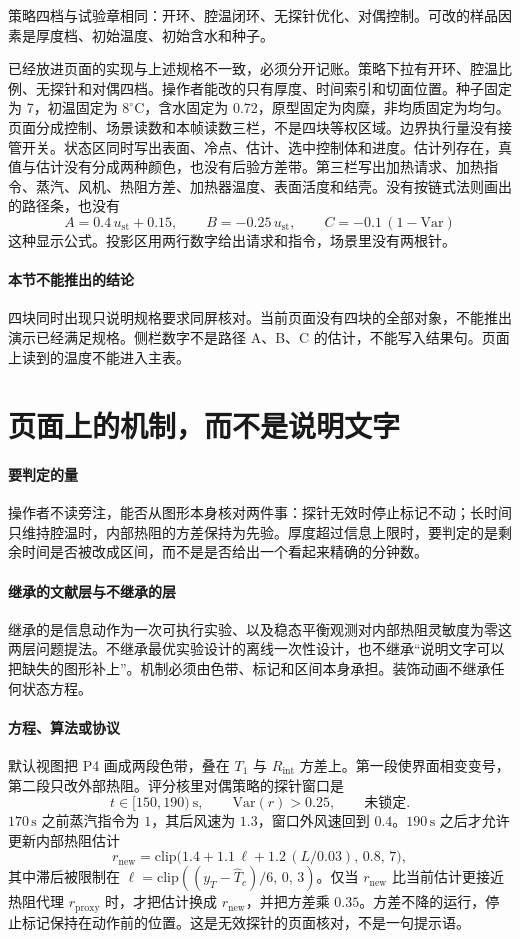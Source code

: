 策略四档与试验章相同：开环、腔温闭环、无探针优化、对偶控制。可改的样品因素是厚度档、初始温度、初始含水和种子。

已经放进页面的实现与上述规格不一致，必须分开记账。策略下拉有开环、腔温比例、无探针和对偶四档。操作者能改的只有厚度、时间索引和切面位置。种子固定为 7，初温固定为 $8^\circ\mathrm{C}$，含水固定为 0.72，原型固定为肉糜，非均质固定为均匀。页面分成控制、场景读数和本帧读数三栏，不是四块等权区域。边界执行量没有接管开关。状态区同时写出表面、冷点、估计、选中控制体和进度。估计列存在，真值与估计没有分成两种颜色，也没有后验方差带。第三栏写出加热请求、加热指令、蒸汽、风机、热阻方差、加热器温度、表面活度和结壳。没有按链式法则画出的路径条，也没有
\[
A=0.4\,u_{\mathrm{st}}+0.15,\qquad
B=-0.25\,u_{\mathrm{st}},\qquad
C=-0.1\,(1-\mathrm{Var})
\]
这种显示公式。投影区用两行数字给出请求和指令，场景里没有两根针。

\paragraph{本节不能推出的结论}
四块同时出现只说明规格要求同屏核对。当前页面没有四块的全部对象，不能推出演示已经满足规格。侧栏数字不是路径 A、B、C 的估计，不能写入结果句。页面上读到的温度不能进入主表。

\section{页面上的机制，而不是说明文字}

\paragraph{要判定的量}
操作者不读旁注，能否从图形本身核对两件事：探针无效时停止标记不动；长时间只维持腔温时，内部热阻的方差保持为先验。厚度超过信息上限时，要判定的是剩余时间是否被改成区间，而不是是否给出一个看起来精确的分钟数。

\paragraph{继承的文献层与不继承的层}
继承的是信息动作为一次可执行实验、以及稳态平衡观测对内部热阻灵敏度为零这两层问题提法。不继承最优实验设计的离线一次性设计，也不继承“说明文字可以把缺失的图形补上”。机制必须由色带、标记和区间本身承担。装饰动画不继承任何状态方程。

\paragraph{方程、算法或协议}
默认视图把 P4 画成两段色带，叠在 $T_1$ 与 $R_{\mathrm{int}}$ 方差上。第一段使界面相变变号，第二段只改外部热阻。评分核里对偶策略的探针窗口是
\[
t\in[150,190)\ \mathrm{s},\qquad \mathrm{Var}(r)>0.25,\qquad \text{未锁定}.
\]
$170\,\mathrm{s}$ 之前蒸汽指令为 $1$，其后风速为 $1.3$，窗口外风速回到 $0.4$。$190\,\mathrm{s}$ 之后才允许更新内部热阻估计
\[
r_{\mathrm{new}}=\mathrm{clip}\big(1.4+1.1\,\ell+1.2\,(L/0.03),\,0.8,\,7\big),
\]
其中滞后被限制在 $\ell=\mathrm{clip}((y_T-\widehat T_c)/6,\,0,\,3)$。仅当 $r_{\mathrm{new}}$ 比当前估计更接近热阻代理 $r_{\mathrm{proxy}}$ 时，才把估计换成 $r_{\mathrm{new}}$，并把方差乘 $0.35$。方差不降的运行，停止标记保持在动作前的位置。这是无效探针的页面核对，不是一句提示语。

